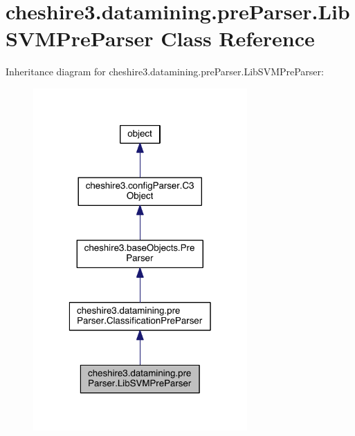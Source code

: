 \hypertarget{classcheshire3_1_1datamining_1_1pre_parser_1_1_lib_s_v_m_pre_parser}{\section{cheshire3.\-datamining.\-pre\-Parser.\-Lib\-S\-V\-M\-Pre\-Parser Class Reference}
\label{classcheshire3_1_1datamining_1_1pre_parser_1_1_lib_s_v_m_pre_parser}
}


Inheritance diagram for cheshire3.\-datamining.\-pre\-Parser.\-Lib\-S\-V\-M\-Pre\-Parser\-:
\nopagebreak
\begin{figure}[H]
\begin{center}
\leavevmode
\includegraphics[width=232pt]{classcheshire3_1_1datamining_1_1pre_parser_1_1_lib_s_v_m_pre_parser__inherit__graph}
\end{center}
\end{figure}


